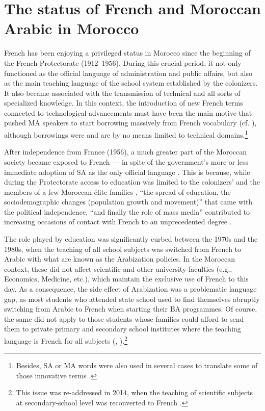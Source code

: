 \documentclass[output=paper]{langscibook}
\begin{document}
\section{The status of French and Moroccan Arabic in Morocco}
French has been enjoying a privileged status in Morocco since the beginning of the French Protectorate (1912--1956). During this crucial period, it not only functioned as the official language of administration and public affairs, but also as the main teaching language of the school system established by the colonizers. It also became associated with the transmission of technical and all sorts of specialized knowledge. In this context, the introduction of new French terms connected to technological advancements must have been the main motive that pushed \gls*{MA} speakers to start borrowing massively from French vocabulary (cf. \citealt[355]{brunot_emprunts_1949}), although borrowings were and are by no means limited to technical domains.\footnote{Besides, \acrshort*{SA} or \gls*{MA} words were also used in several cases to translate some of those innovative terms \citep[356]{brunot_emprunts_1949}.} 

After independence from France (1956), a much greater part of the Moroccan society became exposed to French — in spite of the government’s more or less immediate adoption of \gls*{SA} as the only official language \citep{moatassime_langages_2006, sayahi_diglossia_2014}. This is because, while during the Protectorate access to education was limited to the colonizers’ and the members of a few Moroccan élite families \citep[197--198]{redouane_arabisation_1998},  “the spread of education, the sociodemographic changes (population growth and movement)” that came with the political independence, “and finally the role of mass media” contributed to increasing occasions of contact with French to an unprecedented degree \citep[42]{sayahi_diglossia_2014}.


The role played by education was significantly curbed between the 1970s and the 1980s, when the teaching of all school subjects was switched from French to Arabic with what are known as the Arabization policies. In the Moroccan context, these did not affect scientific and other university faculties (e.g., Economics, Medicine, etc.), which maintain the exclusive use of French to this day. As a consequence, the side effect of Arabization was a problematic language gap, as most students who attended state school used to find themselves abruptly switching from Arabic to French when starting their BA programmes. Of course, the same did not apply to those students whose families could afford to send them to private primary and secondary school institutes where the teaching language is French for all subjects (\citealt[210--212]{ennaji_multilingualism_2005}, \citealt[81]{pellegrini_enseignement_2019}).\footnote{This issue was re-addressed in 2014, when the teaching of scientific subjects at secondary-school level was reconverted to French \citep[81–82]{pellegrini_enseignement_2019}.}
\end{document}

